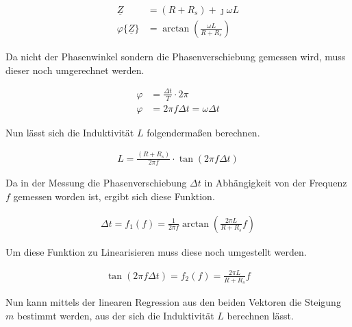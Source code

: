 \begin{equation} \label{eq214}
    \begin{split}
        \underline{Z} &= (R + R_s) + \jmath \omega L\\
        \varphi\{\underline{Z} \} &= \arctan \left( \frac{\omega L}{ R + R_s} \right)
    \end{split}
\end{equation}

Da nicht der Phasenwinkel sondern die Phasenverschiebung gemessen wird,
muss dieser noch umgerechnet werden.

\begin{equation} \label{eq215}
    \begin{split}
        \varphi &= \frac{\Delta t}{T} \cdot 2 \pi \\
        \varphi &= 2 \pi f \Delta t = \omega \Delta t
    \end{split}
\end{equation}

Nun lässt sich die Induktivität $L$ folgendermaßen berechnen.

\begin{equation} \label{eq216}
    \begin{split}
        L = \frac{(R+R_s) }{2 \pi f} \cdot \tan(2 \pi f \Delta t)
    \end{split}
\end{equation}

Da in der Messung die Phasenverschiebung $\Delta t$ in Abhängigkeit
von der Frequenz $f$ gemessen worden ist, ergibt sich diese Funktion.

\begin{equation} \label{eq217}
    \begin{split}
       \Delta t = f_1(f) = \frac{1}{2 \pi f} \arctan \left( \frac{2 \pi L}{R + R_s} f \right)
    \end{split}
\end{equation}

Um diese Funktion zu Linearisieren muss diese noch umgestellt werden.

\begin{equation} \label{eq217}
    \begin{split}
       \tan(2 \pi f \Delta t) = f_2(f) = \frac{2 \pi L}{R + R_s} f
    \end{split}
\end{equation}

Nun kann mittels der linearen Regression aus den beiden Vektoren die Steigung
$m$ bestimmt werden, aus der sich die Induktivität $L$ berechnen lässt.

